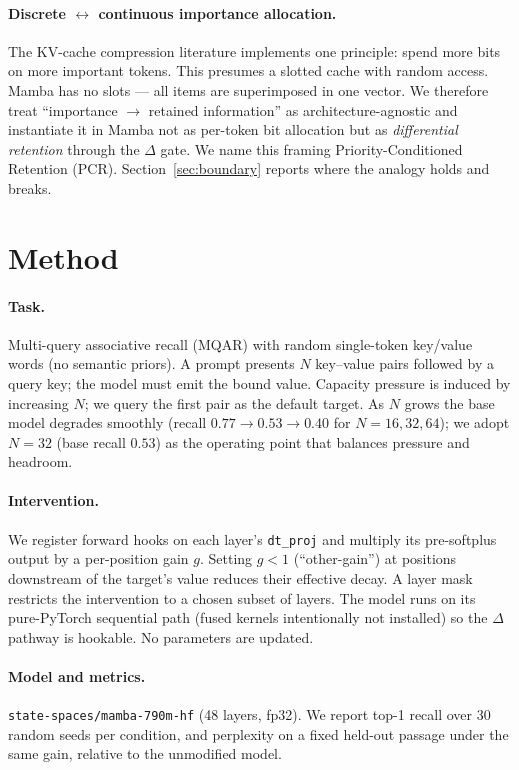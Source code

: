 \documentclass{article}
\begin{document}
\paragraph{Discrete $\leftrightarrow$ continuous importance allocation.}
The KV-cache compression literature
\citep{kivi,kvquant,zipcache,turboquant} implements one principle: spend more
bits on more important tokens. This presumes a slotted cache with random access.
Mamba has no slots --- all items are superimposed in one vector. We therefore
treat ``importance $\to$ retained information'' as architecture-agnostic and
instantiate it in Mamba not as per-token bit allocation but as \emph{differential
retention} through the $\Delta$ gate. We name this framing Priority-Conditioned
Retention (PCR). Section~\ref{sec:boundary} reports where the analogy holds and
breaks.

\section{Method}
\paragraph{Task.}
Multi-query associative recall (MQAR) with random single-token key/value words
(no semantic priors). A prompt presents $N$ key--value pairs followed by a query
key; the model must emit the bound value. Capacity pressure is induced by
increasing $N$; we query the first pair as the default target. As $N$ grows the
base model degrades smoothly (recall $0.77 \to 0.53 \to 0.40$ for
$N{=}16,32,64$); we adopt $N{=}32$ (base recall $0.53$) as the operating point
that balances pressure and headroom.

\paragraph{Intervention.}
We register forward hooks on each layer's \texttt{dt\_proj} and multiply its
pre-softplus output by a per-position gain $g$. Setting $g<1$ (``other-gain'') at
positions downstream of the target's value reduces their effective decay. A layer
mask restricts the intervention to a chosen subset of layers. The model runs on
its pure-PyTorch sequential path (fused kernels intentionally not installed) so
the $\Delta$ pathway is hookable. No parameters are updated.

\paragraph{Model and metrics.}
\texttt{state-spaces/mamba-790m-hf} (48 layers, fp32). We report top-1 recall
over 30 random seeds per condition, and perplexity on a fixed held-out passage
under the same gain, relative to the unmodified model.
\end{document}
